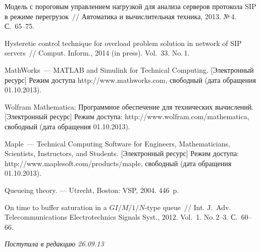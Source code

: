 \begin{multicols}{2}
{{\begin{thebibliography}{99}
Модель с пороговым управлением нагрузкой для
анализа серверов протокола SIP в режиме перегрузок~//
Автоматика и вычислительная техника, 2013. №\,4. С.~65--75.

Hysteretic control technique for overload problem
solution in network of SIP servers~//
Comput. Inform., 2014 (in press). Vol.~33. No.\,1.

MathWorks~--- MATLAB and Simulink for Technical
Computing. [Электронный ресурс] Режим доступа
{\sf http://www.mathworks.com}, свободный
(дата обращения 01.10.2013).

Wolfram Mathematica: Программное обеспечение для
технических вычислений. [Электронный ресурс]
Режим доступа: {\sf http://www.wolfram.com/mathematica}, свободный
(дата обращения 01.10.2013).

Maple~--- Technical Computing Software for
Engineers, Mathematicians, Scientists,
Instructors, and Students. [Электронный ресурс]
Режим доступа:
{\sf http://www.maplesoft.com/products/maple}, свободный (дата обращения 01.10.2013).

Queueing theory. --- Utrecht, Boston: VSP, 2004. 446~p.

 On time to buffer saturation in a $GI/M/1/N$-type queue~// 
Int. J.~Adv. Telecommunications
Electrotechnics Signals Syst., 2012. Vol.~1. No.\,2--3. С.~60--66.


 \end{thebibliography} } }
 
\end{multicols}

 \hfill{\small \textit{Поступила в редакцию 26.09.13}}







\newpage

\def\tit{THE DISTRIBUTION OF THE~RETURN TIME
FROM~THE~SET OF~OVERLOAD STATES TO~THE~SET OF~NORMAL LOAD STATES IN~A~SYSTEM
$M|M|1|\langle L,H \rangle |\langle H,R \rangle$
WITH~HYSTERETIC LOAD CONTROL}

\def\aut{Yu.\,V.~Gaidamaka$^1$, 
A.\,V.~Pechinkin$^2$,  R.\,V.~Razumchik$^2$, A.\,K.~Samuylov$^1$,
K.\,E.~Samouylov$^1$, I.\,A.~Sokolov$^2$, E.\,S.~Sopin$^1$, and~S.\,Ya.~Shorgin$^2$}


